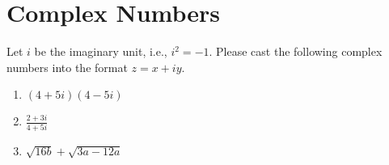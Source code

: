 {
\section{Complex Numbers}
Let $i$ be the imaginary unit, i.e., $i^2 = -1$.
Please cast the following complex numbers into the format $z=x + iy$.
\begin{enumerate}
	\item $(4+ 5i)(4 - 5i)$
	\item $\frac{2+3i}{4 + 5i}$
	\item $\sqrt{16b} + \sqrt{3a - 12a}$
\end{enumerate}
}